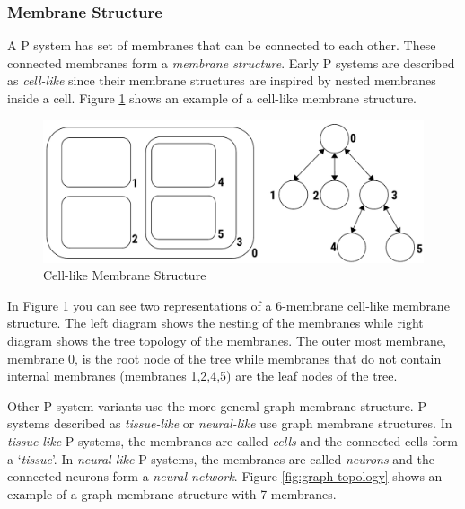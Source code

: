 \documentclass{article}
\begin{document}
\subsubsection{Membrane Structure}\label{s-membrane}

A P system has set of membranes that can be connected to each other. These connected membranes form
a \textit{membrane structure}. Early P systems are described as \textit{cell-like} since their 
membrane structures are inspired by nested membranes inside a cell. Figure \ref{fig:cell-like} shows 
an example of a cell-like membrane structure.

\begin{figure}[H]
\begin{center}
\includegraphics[scale=0.60]{figures/zzz-cell-like-structure.pdf}
\caption{Cell-like Membrane Structure}
\label{fig:cell-like}
\end{center}
\end{figure}

In Figure \ref{fig:cell-like} you can see two representations of a 6-membrane cell-like membrane 
structure. The left diagram shows the nesting of the membranes while right diagram shows the tree 
topology of the membranes. The outer most membrane, membrane 0, is the root node of the tree while 
membranes that do not contain internal membranes (membranes 1,2,4,5) are the leaf nodes of the tree.

Other P system variants use the more general graph membrane structure. P systems described as
\textit{tissue-like} or \textit{neural-like} use graph membrane structures. In \textit{tissue-like}
P systems, the membranes are called \textit{cells} and the connected cells form a `\textit{tissue}'. 
In \textit{neural-like} P systems, the membranes are called \textit{neurons} and the connected 
neurons form a \textit{neural network}. Figure \ref{fig:graph-topology} shows an example of a graph
membrane structure with 7 membranes.
\end{document}
